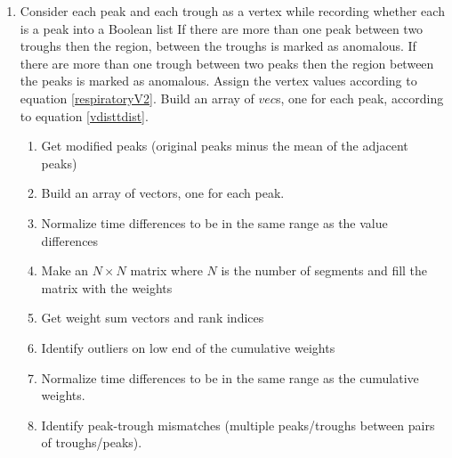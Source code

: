 \documentclass[twoside,twocolumn]{article}
\begin{document}
\begin{enumerate}
\begin{enumerate}
		\[
		\text{frac} = \operatorname{median}\left(\frac{t - p_1}{(t - p_1) + (p_2 - t)}\right)
		\]
		If no valid cycles were found, default to $\text{frac} = 0.5$ (trough assumed halfway between peaks).
		\item Re-sort all peaks and troughs together into a single chronological event list (recomputed, since the arrays haven't changed at this point).
		\item Scan the sorted events for consecutive pairs sharing the same type (two peaks in a row, or two troughs in a row) and collect these as \texttt{bad\_events}, indicating a bijectivity violation.
		\item For each such same-type adjacent pair $(x_1, x_2)$:
		\begin{enumerate}
			\item If both are peaks (`PP`), insert a missing trough at $x_1 + \text{frac} \cdot (x_2 - x_1)$, rounded to the nearest integer.
			\item If both are troughs (`TT`), insert a missing peak at $x_1 - \text{frac} \cdot (x_1 - x_2)$, rounded to the nearest integer.
		\end{enumerate}
		\item Append the newly inferred peaks to \texttt{respiratoryPeaks} and the newly inferred troughs to \texttt{respiratoryTroughs}, then sort each resulting array.
		\item Return the corrected peaks array, the corrected troughs array, and the lists of added peaks and added troughs.
	\end{enumerate}
	\item Consider each peak and each trough as a vertex while recording whether each is a peak into a Boolean list If there are more than one peak between two troughs then the region, between the troughs is marked as anomalous. If there are more than one trough between two peaks then the region between the peaks is marked as anomalous. Assign the vertex values according to equation \ref{respiratoryV2}. Build an array of $vec$s, one for each peak, according to equation \ref{vdisttdist}.
	\begin{enumerate}
		\item Get modified peaks (original peaks minus the mean of the adjacent peaks)
		\item Build an array of vectors, one for each peak.
		\item Normalize time differences to be in the same range as the value differences
		\item Make an $N \times N$ matrix where $N$ is the number of segments and fill the matrix with the weights
		\item Get weight sum vectors and rank indices
		\item Identify outliers on low end of the cumulative weights
		\item Normalize time differences to be in the same range as the cumulative weights.
		\item Identify peak-trough mismatches (multiple peaks/troughs between pairs of troughs/peaks).
	\end{enumerate}	
\end{enumerate}
\end{document}
